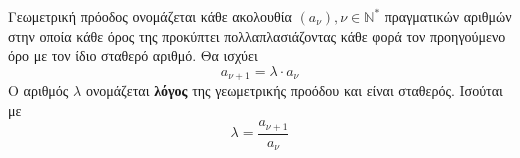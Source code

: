 Γεωμετρική πρόοδος ονομάζεται κάθε ακολουθία $ (a_\nu),\nu\in\mathbb{N}^* $ πραγματικών αριθμών στην οποία κάθε όρος της προκύπτει πολλαπλασιάζοντας κάθε φορά τον προηγούμενο όρο με τον ίδιο σταθερό αριθμό. Θα ισχύει
\[ a_{\nu+1}=\lambda\cdot a_\nu \]
Ο αριθμός $ \lambda $ ονομάζεται \textbf{λόγος} της γεωμετρικής προόδου και είναι σταθερός. Ισούται με \[ \lambda=\frac{a_{\nu+1}}{a_\nu} \]
